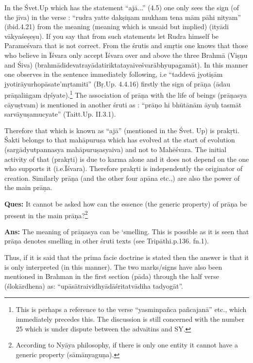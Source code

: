 In the Śvet.Up which has the statement “ajā...” (4.5) one only sees the sign (of the jīva) in the verse : “rudra yatte dakṣiṇam mukham tena mām pāhi nityam” (ibid.4.21) from the meaning (meaning which is unsaid but implied) (ityādi vākyaśeṣeṣu). If you say that from such statements let Rudra himself be Parameśvara that is not correct. From the śrutis and smṛtis one knows that those who believe in Īśvara only accept Īśvara over and above the three Brahmā (Viṣṇu and Śiva) (brahmādidevatrayādatiriktatayaiveśvarābhyupagamāt). In this manner one observes in the sentence immediately following, i.e “taddevā jyotiṣām jyotirāyurhopāsate’mṛtamiti” (Bṛ.Up. 4.4.16) firstly the sign of prāṇa (ādau prāṇaliṅgam dṛśyate).\footnote{This is perhaps a reference to the verse “yasminpañca pañcajanā” etc., which immediately precedes this. The discussion is still concerned with the number 25 which is under dispute between the  advaitins and SY.} The association of prāṇa with the life of beings (prāṇasya cāyuṣtvam) is mentioned in another śruti as : “prāṇo hi bhūtānām āyuḥ tasmāt sarvāyuṣamucyate” (Taitt.Up. II.3.1).
 
Therefore that which is known as “ajā” (mentioned in the Śvet. Up) is prakṛti. Śakti belongs to that mahāpuruṣa which has evolved at the start of evolution (sargādyutpannasya mahāpuruṣasyaiva) and not to Mahēśvara. The initial activity of that (prakṛti) is due to karma alone and it does not depend on the one who supports it (i.e.Īśvara). Therefore prakṛti is independently the originator of creation. Similarly prāṇa (and the other four apāna etc.,) are also the power of the main prāṇa.

\textbf{Ques:} It cannot be asked how can the essence (the generic property) of prāṇa be present in the main prāṇa?\footnote{According to Nyāya philosophy, if there is only one entity it cannot have a generic property (sāmānyaguṇa).}

\textbf{Ans:} The meaning of prāṇasya can be ‘smelling. This is possible as it is seen that prāṇa denotes smelling in other śruti texts (see Tripāthi.p.136. fn.1).

Thus, if it is said that the prima facie doctrine is stated then the answer is that it is only interpreted (in this manner). The two marks/signs have also been mentioned in Brahman in the first section (pāda) through the half verse (ślokārdhena) as: “upāsātraividhyādāśritatvādiha tadyogāt”.


